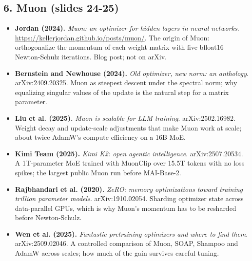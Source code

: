 \documentclass[11pt,letterpaper]{article}
\begin{document}
\subsection*{6. Muon (slides 24-25)}
\begin{itemize}[leftmargin=1.2em,itemsep=3pt]\sloppy
\item \textbf{Jordan (2024).} \textit{Muon: an optimizer for hidden layers in neural networks}. \url{https://kellerjordan.github.io/posts/muon/}. The origin of Muon: orthogonalize the momentum of each weight matrix with five bfloat16 Newton-Schulz iterations. Blog post; not on arXiv.
\item \textbf{Bernstein and Newhouse (2024).} \textit{Old optimizer, new norm: an anthology}. arXiv:2409.20325. Muon as steepest descent under the spectral norm; why equalizing singular values of the update is the natural step for a matrix parameter.
\item \textbf{Liu et al. (2025).} \textit{Muon is scalable for LLM training}. arXiv:2502.16982. Weight decay and update-scale adjustments that make Muon work at scale; about twice AdamW's compute efficiency on a 16B MoE.
\item \textbf{Kimi Team (2025).} \textit{Kimi K2: open agentic intelligence}. arXiv:2507.20534. A 1T-parameter MoE trained with MuonClip over 15.5T tokens with no loss spikes; the largest public Muon run before MAI-Base-2.
\item \textbf{Rajbhandari et al. (2020).} \textit{ZeRO: memory optimizations toward training trillion parameter models}. arXiv:1910.02054. Sharding optimizer state across data-parallel GPUs, which is why Muon's momentum has to be resharded before Newton-Schulz.
\item \textbf{Wen et al. (2025).} \textit{Fantastic pretraining optimizers and where to find them}. arXiv:2509.02046. A controlled comparison of Muon, SOAP, Shampoo and AdamW across scales; how much of the gain survives careful tuning.
\end{itemize}
\end{document}
